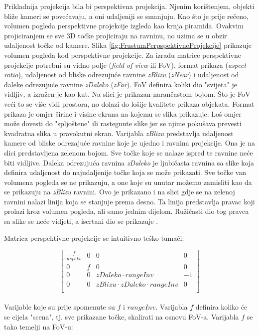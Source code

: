 \documentclass{foi}
\begin{document}
Prikladnija projekcija bila bi perspektivna projekcija. Njenim korištenjem, objekti bliže kameri se povećavaju, a oni udaljeniji se smanjuju. Kao što je prije rečeno, volumen pogleda perspektivne projekcije izgleda kao krnja piramida. Ovakvim projiciranjem se sve 3D točke projiciraju na ravninu, no uzima se u obzir udaljenost točke od kamere. Slika \ref{fig:FrustumPerpspektivneProjekcije} prikazuje volumen pogleda kod perspektivne projekcije. Za izradu matrice perspektivne projekcije potrebni su vidno polje (\textit{field of view} ili FoV), format prikaza (\textit{aspect ratio}), udaljenost od bliske odrezujuće ravnine \textit{zBlizu} (\textit{zNear}) i udaljenost od daleke odrezujuće ravnine \textit{zDaleko} (\textit{zFar}). FoV definira koliki dio "svijeta" je vidljiv, a izražen je kao kut. Na slici je prikazan narančastom bojom. Što je FoV veći to se više vidi prostora, no dolazi do lošije kvalitete prikaza objekata. Format prikaza je omjer širine i visine ekrana na kojemu se slika prikazuje. Loš omjer može dovesti do "spljoštene" ili rastegnute slike jer se njime pokušava prevesti kvadratna slika u pravokutni ekran. Varijabla \textit{zBlizu} predstavlja udaljenost kamere od bliske odrezajuće ravnine koje je ujedno i ravnina projekcije. Ona je na slici predstavljena zelenom bojom. Sve točke koje se nalaze ispred te ravnine neće biti vidljive. Daleka odrezujuća ravnina \textit{zDaleko} je ljubičasta ravnina sa slike koja definira udaljenost do najudaljenije točke koja se može prikazati. Sve točke van volumena pogleda se ne prikazuju, a one koje su unutar možemo zamisliti kao da se prikazuju na \textit{zBlizu} ravnini. Ovo je prikazano i na slici gdje se na zelenoj ravnini nalazi linija koja se stanjuje prema desno. Ta linija predstavlja pravac koji prolazi kroz volumen pogleda, ali samo jednim dijelom. Ružičasti dio tog pravca sa slike se neće vidjeti, a iscrtani dio se prikazuje \parencite{Perspective3DBezDat}. 

Matrica perspektivne projekcije \parencite{WebGPUFundamentalsPerspective} se intuitivno teško tumači:

\[
\begin{bmatrix}
	\frac{f}{aspekt} & 0 & 0 & 0 \\
	0 & f & 0 & 0 \\
	0 & 0 & zDaleko \cdot rangeInv & -1 \\
	0 & 0 & zBlizu \cdot zDaleko \cdot rangeInv & 0 \\
\end{bmatrix}
\]
\\Varijable koje su prije spomenute su $f$ i $rangeInv$. Varijabla $f$ definira koliko će se cijela "scena", tj. sve prikazane točke, skalirati na osnovu FoV-a. Varijabla $f$ se tako temelji na FoV-u:
\end{document}
